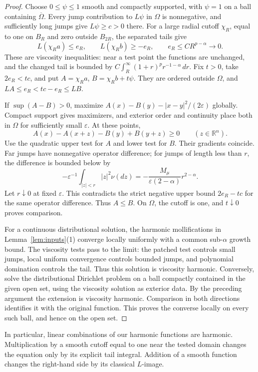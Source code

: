 \documentclass[11pt]{article}
\numberwithin{equation}{section}
\newcommand{\R}{\mathbb R}
\begin{document}
\begin{proof}
Choose \(0\le\psi\le1\) smooth and compactly supported, with \(\psi=1\)
on a ball containing \(\overline\Omega\). Every jump contribution to
\(L\psi\) in \(\Omega\) is nonnegative, and sufficiently long jumps give
\(L\psi\ge c>0\) there. For a large radial cutoff \(\chi_R\), equal
to one on \(B_R\) and zero outside \(B_{2R}\), the separated tails give
\[
 L(\chi_Ra)\le e_R,\qquad L(\chi_Rb)\ge-e_R,
 \qquad e_R\le C R^{p-\alpha}\longrightarrow0.
\]
These are viscosity inequalities: near a test point the functions are
unchanged, and the changed tail is bounded by
\(C\int_R^\infty(1+r)^p r^{-1-\alpha}\,dr\).
Fix \(t>0\), take \(2e_R<tc\), and put
\(A=\chi_Ra\), \(B=\chi_Rb+t\psi\).
They are ordered outside \(\Omega\), and
\(LA\le e_R<tc-e_R\le LB\).

If \(\sup(A-B)>0\), maximize
\(A(x)-B(y)-|x-y|^2/(2\varepsilon)\) globally. Compact support gives
maximizers, and exterior order and continuity place both in \(\Omega\)
for sufficiently small \(\varepsilon\). At these points,
\[
 A(x)-A(x+z)-B(y)+B(y+z)\ge0\qquad(z\in\R^n).
\]
Use the quadratic upper test for \(A\) and lower test for \(B\).
Their gradients coincide. Far jumps have nonnegative operator difference;
for jumps of length less than \(r\), the difference is bounded below by
\[
 -\varepsilon^{-1}\int_{|z|<r}|z|^2\nu(dz)
 =-\frac{M_\mu}{\varepsilon(2-\alpha)}r^{2-\alpha}.
\]
Let \(r\downarrow0\) at fixed \(\varepsilon\). This contradicts the
strict negative upper bound \(2e_R-tc\) for the same operator difference.
Thus \(A\le B\). On \(\Omega\), the cutoff is one, and \(t\downarrow0\)
proves comparison.

For a continuous distributional solution, the harmonic mollifications in
Lemma~\ref{lem:inputs}(1) converge locally uniformly with a common
sub-\(\alpha\) growth bound. The viscosity tests pass to the limit:
the patched test controls small jumps, local uniform convergence controls
bounded jumps, and polynomial domination controls the tail.
Thus this solution is viscosity harmonic. Conversely, solve the
distributional Dirichlet problem on a ball compactly contained in the given
open set, using the viscosity solution as exterior data. By the preceding
argument the extension is viscosity harmonic. Comparison in both directions
identifies it with the original function. This proves the converse locally
on every such ball, and hence on the open set.
\end{proof}

In particular, linear combinations of our harmonic functions are harmonic.
Multiplication by a smooth cutoff equal to one near the tested domain changes
the equation only by its explicit tail integral. Addition of a smooth
function changes the right-hand side by its classical \(L\)-image.
\end{document}
